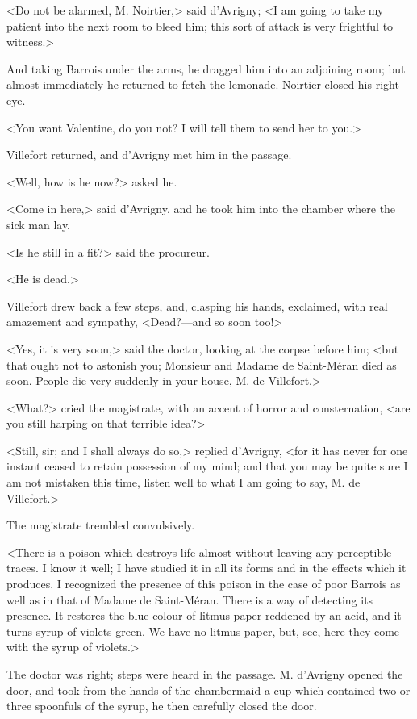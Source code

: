  <Do not be alarmed, M. Noirtier,> said d'Avrigny; <I am going to take my patient into the next room to bleed him; this sort of attack is very frightful to witness.> 

 And taking Barrois under the arms, he dragged him into an adjoining room; but almost immediately he returned to fetch the lemonade. Noirtier closed his right eye. 

 <You want Valentine, do you not? I will tell them to send her to you.> 

 Villefort returned, and d'Avrigny met him in the passage. 

 <Well, how is he now?> asked he. 

 <Come in here,> said d'Avrigny, and he took him into the chamber where the sick man lay. 

 <Is he still in a fit?> said the procureur. 

 <He is dead.> 

 Villefort drew back a few steps, and, clasping his hands, exclaimed, with real amazement and sympathy, <Dead?—and so soon too!> 

 <Yes, it is very soon,> said the doctor, looking at the corpse before him; <but that ought not to astonish you; Monsieur and Madame de Saint-Méran died as soon. People die very suddenly in your house, M. de Villefort.> 

 <What?> cried the magistrate, with an accent of horror and consternation, <are you still harping on that terrible idea?> 

 <Still, sir; and I shall always do so,> replied d'Avrigny, <for it has never for one instant ceased to retain possession of my mind; and that you may be quite sure I am not mistaken this time, listen well to what I am going to say, M. de Villefort.> 

 The magistrate trembled convulsively. 

 <There is a poison which destroys life almost without leaving any perceptible traces. I know it well; I have studied it in all its forms and in the effects which it produces. I recognized the presence of this poison in the case of poor Barrois as well as in that of Madame de Saint-Méran. There is a way of detecting its presence. It restores the blue colour of litmus-paper reddened by an acid, and it turns syrup of violets green. We have no litmus-paper, but, see, here they come with the syrup of violets.> 

 The doctor was right; steps were heard in the passage. M. d'Avrigny opened the door, and took from the hands of the chambermaid a cup which contained two or three spoonfuls of the syrup, he then carefully closed the door. 

